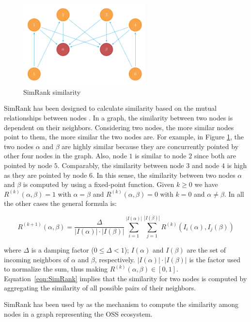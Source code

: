\begin{figure}[h!]
	\centering
	\includegraphics[width=0.60\textwidth]{images/SimRank.pdf}
	\caption{SimRank similarity}
	\label{fig:SimRank}
\end{figure}

SimRank has been designed to calculate similarity based on the mutual relationships between nodes \cite{Jeh:2002:SMS:775047.775126}. In a graph, the similarity between two nodes is dependent on their neighbors. Considering two nodes, the more similar nodes point to them, the more similar the two nodes are. For example, in Figure \ref{fig:SimRank}, the two nodes $\alpha$ and $\beta $ are highly similar because they are concurrently pointed by other four nodes in the graph. Also, node $1$ is similar to node $2$ since both are pointed by node $5$. Comparably, the similarity between node $3$ and node $4$ is high as they are pointed by node $6$. In this sense, the similarity between two nodes $\alpha$ and $\beta$ is computed by using a fixed-point function. Given $k \geq 0$ we have $R^{(k)}(\alpha,\beta) = 1$ with $\alpha = \beta$ and $R^{(k)}(\alpha,\beta) = 0$ with $k=0$ and $\alpha \neq \beta$. In all the other cases the general formula is:

\begin{equation}\label{eqn:SimRank}
R^{(k+1)}(\alpha,\beta) = 
\frac{\Delta}{|I(\alpha)|\cdot|I(\beta)|}\sum_{i=1}^{|I(\alpha)|}\sum_{j=1}^{|I(\beta)|}R^{(k)}(I_{i}(\alpha),I_{j}(\beta))
\end{equation}

where $\Delta$ is a damping factor ($0 \leq \Delta < 1$); $I(\alpha)$ and $I(\beta)$ are the set of incoming neighbors of $\alpha$ and $\beta$, respectively. $|I(\alpha)|\cdot|I(\beta)|$ is the factor used to normalize the sum, thus making $R^{(k)}(\alpha,\beta) \in [0,1]$. Equation~\ref{eqn:SimRank} implies that the similarity for two nodes is computed by aggregating the similarity of all possible pairs of their neighbors. 

SimRank has been used by \CrossSim  \cite{NDRDSEAA2018} as the mechanism to compute the similarity among nodes in a graph representing the OSS ecosystem.






